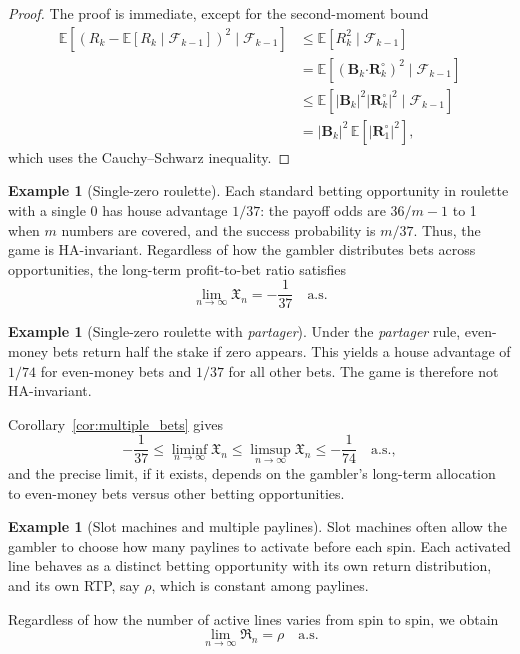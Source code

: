 \documentclass{article}
\theoremstyle{definition}
\newtheorem{example}[theorem]{Example}
\theoremstyle{remark}
\newcommand{\E}{\mathbb{E}}
\newcommand{\F}{\mathscr{F}}
\begin{document}
\begin{proof}
The proof is immediate, except for the second-moment bound
\begin{align*}
\E[(R_k - \E[R_k \mid \F_{k-1}])^2\mid \F_{k-1}] 
    &\le \E[R_k^2\mid \F_{k-1}]\\
    &=\E[(\bm B_k\bm\cdot\bm R_k^\circ)^2\mid\F_{k-1}]\\
    &\le \E[|\bm B_k|^2|\bm R_k^\circ|^2\mid\F_{k-1}]\\
    &=|\bm B_k|^2\,\E[|\bm R_1^\circ|^2],
\end{align*}
which uses the Cauchy--Schwarz inequality. \qedhere
\end{proof}


\begin{example}[Single-zero roulette]
Each standard betting opportunity in roulette with a single 0 has house advantage $1/37$: the payoff odds are $36/m - 1$ to 1 when $m$ numbers are covered, and the success probability is $m/37$.  
Thus, the game is HA-invariant.  
Regardless of how the gambler distributes bets across opportunities, the long-term profit-to-bet ratio satisfies
\[
\lim_{n\to\infty}\mathfrak{X}_n = -\frac{1}{37}\quad\text{a.s.}
\]
\end{example}

\begin{example}[Single-zero roulette with \textit{partager}]
Under the \textit{partager} rule, even-money bets return half the stake if zero appears.  
This yields a house advantage of $1/74$ for even-money bets and $1/37$ for all other bets.  
The game is therefore not HA-invariant.


Corollary~\ref{cor:multiple_bets} gives
\[
    -\frac{1}{37}
   \le\liminf_{n\to\infty}\mathfrak{X}_n\le
     \limsup_{n\to\infty}\mathfrak{X}_n\le
    -\frac{1}{74}\quad\text{a.s.},
\]
and the precise limit, if it exists, depends on the gambler’s long-term allocation to even-money bets versus other betting opportunities.
\end{example}


\begin{example}[Slot machines and multiple paylines]
Slot machines often allow the gambler to choose how many paylines to activate before each spin.  
Each activated line behaves as a distinct betting opportunity with its own return distribution, and its own RTP, say $\rho$, which is constant among paylines. 

Regardless of how the number of active lines varies from spin to spin, we obtain
\[
\lim_{n\to\infty}\mathfrak{R}_n=\rho\quad\text{a.s.}
\]
\end{example}
\end{document}
